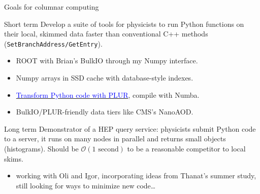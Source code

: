 \documentclass{beamer}
\begin{document}
\begin{frame}{Goals for columnar computing}
\vspace{0.2 cm}
\begin{block}{Short term}
Develop a suite of tools for physicists to run Python functions on their local, skimmed data faster than conventional C++ methods ({\tt\small SetBranchAddress/GetEntry}).
\begin{itemize}
\item ROOT with Brian's BulkIO through my Numpy interface.
\item Numpy arrays in SSD cache with database-style indexes.
\item \href{https://github.com/diana-hep/plur}{\textcolor{blue}{Transform Python code with PLUR}}, compile with Numba.
\item BulkIO/PLUR-friendly data tiers like CMS's NanoAOD.
\end{itemize}
\end{block}

\begin{block}{Long term}
Demonstrator of a HEP query service: physicists submit Python code to a server, it runs on many nodes in parallel and returns small objects (histograms). Should be $\mathcal{O}({\mbox{1 second}})$ to be a reasonable competitor to local skims.
\begin{itemize}
\item working with Oli and Igor, incorporating ideas from Thanat's summer study, still looking for ways to minimize new code\ldots
\end{itemize}
\end{block}
\end{frame}
\end{document}
